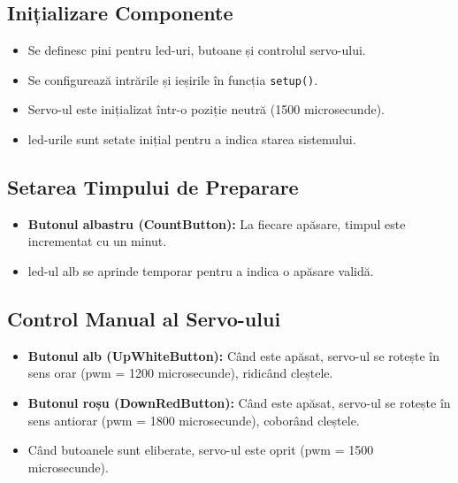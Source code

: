 \subsection{Inițializare Componente}

\begin{itemize}
    \item Se definesc pini pentru \gls{led}-uri, %
    butoane și controlul servo-ului.  

    \item Se configurează intrările și %
    ieșirile în funcția \texttt{setup()}.  

    \item Servo-ul este inițializat într-o %
    poziție neutră (1500 microsecunde).  

    \item \gls{led}-urile sunt setate inițial %
    pentru a indica starea sistemului.  
\end{itemize}

\subsection{Setarea Timpului de Preparare}

\begin{itemize}
    \item \textbf{Butonul albastru (CountButton):} %
    La fiecare apăsare, timpul este %
    incrementat cu un minut.  

    \item \gls{led}-ul alb se aprinde temporar %
    pentru a indica o apăsare validă.  
\end{itemize}

\subsection{Control Manual al Servo-ului}

\begin{itemize}
    \item \textbf{Butonul alb (UpWhiteButton):} %
    Când este apăsat, servo-ul se %
    rotește în sens orar %
    (\gls{pwm} = 1200 microsecunde), ridicând %
    cleștele.  

    \item \textbf{Butonul roșu (DownRedButton):} %
    Când este apăsat, servo-ul se %
    rotește în sens antiorar %
    (\gls{pwm} = 1800 microsecunde), coborând %
    cleștele.  

    \item Când butoanele sunt eliberate, %
    servo-ul este oprit %
    (\gls{pwm} = 1500 microsecunde).  
\end{itemize}

